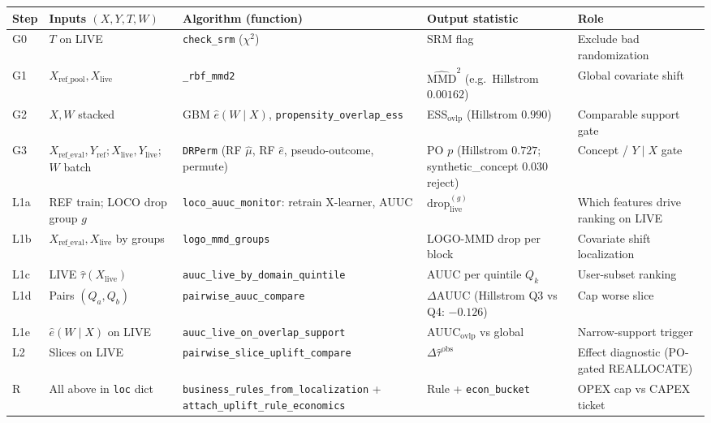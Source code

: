 \documentclass[11pt]{article}
\begin{document}
\begin{longtable}{@{}p{}p{}p{}p{}p{}@{}}
\toprule
Step & Inputs $(X,Y,T,W)$ & Algorithm (function) & Output statistic & Role \\
\midrule
\endhead
G0 & $T$ on LIVE & \texttt{check\_srm} ($\chi^2$) & SRM flag & Exclude bad randomization \\
G1 & $X_{\mathrm{ref\_pool}}, X_{\mathrm{live}}$ & \texttt{\_rbf\_mmd2} & $\widehat{\mathrm{MMD}}^2$ (e.g.\ Hillstrom $0.00162$) & Global covariate shift \\
G2 & $X,W$ stacked & GBM $\hat e(W\mid X)$, \texttt{propensity\_overlap\_ess} & ESS$_{\mathrm{ovlp}}$ (Hillstrom $0.990$) & Comparable support gate \\
G3 & $X_{\mathrm{ref\_eval}}, Y_{\mathrm{ref}}; X_{\mathrm{live}}, Y_{\mathrm{live}}$; $W$ batch & \texttt{DRPerm} (RF $\hat\mu$, RF $\hat e$, pseudo-outcome, permute) & PO $p$ (Hillstrom $0.727$; synthetic\_concept $0.030$ reject) & Concept / $Y\mid X$ gate \\
L1a & REF train; LOCO drop group $g$ & \texttt{loco\_auuc\_monitor}: retrain X-learner, AUUC & $\mathrm{drop}_{\mathrm{live}}^{(g)}$ & Which features drive ranking on LIVE \\
L1b & $X_{\mathrm{ref\_eval}}, X_{\mathrm{live}}$ by groups & \texttt{logo\_mmd\_groups} & LOGO-MMD drop per block & Covariate shift localization \\
L1c & LIVE $\hat\tau(X_{\mathrm{live}})$ & \texttt{auuc\_live\_by\_domain\_quintile} & AUUC per quintile $Q_k$ & User-subset ranking \\
L1d & Pairs $(Q_a,Q_b)$ & \texttt{pairwise\_auuc\_compare} & $\Delta\mathrm{AUUC}$ (Hillstrom Q3 vs Q4: $-0.126$) & Cap worse slice \\
L1e & $\hat e(W\mid X)$ on LIVE & \texttt{auuc\_live\_on\_overlap\_support} & AUUC$_{\mathrm{ovlp}}$ vs global & Narrow-support trigger \\
L2 & Slices on LIVE & \texttt{pairwise\_slice\_uplift\_compare} & $\Delta\widehat{\tau}^{\mathrm{obs}}$ & Effect diagnostic (PO-gated REALLOCATE) \\
R & All above in \texttt{loc} dict & \texttt{business\_rules\_from\_localization} + \texttt{attach\_uplift\_rule\_economics} & Rule + \texttt{econ\_bucket} & OPEX cap vs CAPEX ticket \\
\bottomrule
\end{longtable}
\end{document}
